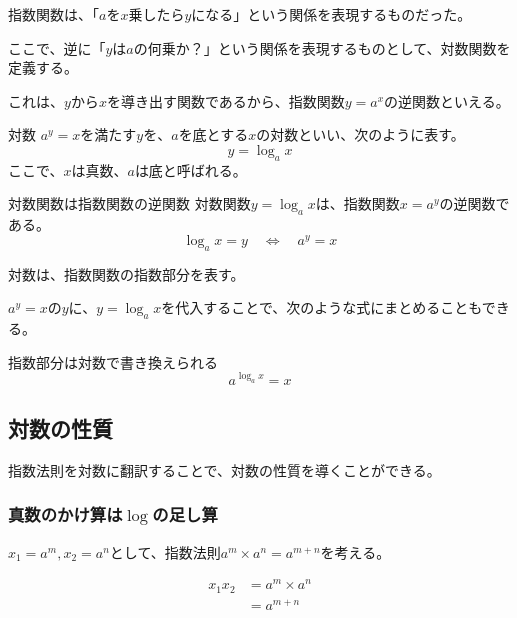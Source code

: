 \documentclass[16pt,b5paper]{book}
\begin{document}
指数関数は、「$a$を$x$乗したら$y$になる」という関係を表現するものだった。

ここで、逆に「$y$は$a$の何乗か？」という関係を表現するものとして、対数関数を定義する。

これは、$y$から$x$を導き出す関数であるから、指数関数$y=a^x$の逆関数といえる。

\begin{definition}{対数}
  \newline
  $a^y = x$を満たす$y$を、$a$を底とする$x$の対数といい、次のように表す。
  \LARGE
  \begin{equation}
    y = \log_a x
  \end{equation}
  \normalsize
  ここで、$x$は真数、$a$は底と呼ばれる。
\end{definition}

\begin{definition}{対数関数は指数関数の逆関数}
  \newline
  対数関数$y=\log_a x$は、指数関数$x = a^y$の逆関数である。
  \LARGE
  \begin{equation}
    \log_a x = y \quad \Longleftrightarrow  \quad a^y = x
  \end{equation}
\end{definition}

対数は、指数関数の指数部分を表す。

$a^y = x$の$y$に、$y=\log_a x$を代入することで、次のような式にまとめることもできる。

\begin{theorem}{指数部分は対数で書き換えられる}
  \LARGE
  \begin{equation}
    a^{\log_a x} = x
  \end{equation}
\end{theorem}

\subsection{対数の性質}

指数法則を対数に翻訳することで、対数の性質を導くことができる。

\subsubsection{真数のかけ算は$\log$の足し算}

$x_1 = a^m, x_2 = a^n$として、指数法則$a^m \times a^n = a^{m+n}$を考える。

\begin{align}
  x_1  x_2 & = a^m \times a^n \\
           & = a^{m+n}
\end{align}
\end{document}
